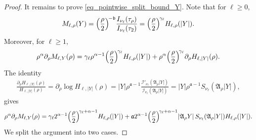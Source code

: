 \documentclass[12pt]{amsart}
\begin{document}
\begin{proof}
It remains to prove \eqref{eq_pointwise_split_bound_Y}. Note that for $\ell\ge 0$,
\begin{equation}\label{eq_M_H}
    M_{\ell,\rho}(Y) = \Bigl( \frac{\rho}{2} \Bigr)^{\!-\mathfrak b} \frac{I_{\nu_\ell}(\tau_\rho)}{I_{\nu_\ell}(\tau_2)} = \Bigl( \frac{\rho}{2} \Bigr)^{\!\gamma_\ell} H_{\ell,\rho}(|Y|).
\end{equation}
Moreover, for $\ell\ge 1$,
\begin{align*}
    \rho^\alpha \partial_\rho M_{\ell, Y}(\rho)
    = \gamma_\ell \rho^{\alpha-1} \Bigl(\frac{\rho}{2}\Bigr)^{\!\gamma_\ell} H_{\ell,\rho}(|Y|) + \rho^{\alpha} \Bigl(\frac{\rho}{2}\Bigr)^{\!\gamma_\ell} \partial_\rho H_{\ell,|Y|}(\rho).
\end{align*}
The identity
\begin{align*}
    \frac{\partial_\rho H_{\ell, |Y|}(\rho)}{H_{\ell, |Y|}(\rho)}
    = \partial_\rho \log H_{\ell, |Y|}(\rho)
    = |Y| \rho^{\mathfrak a-1} \frac{\mathcal{I}'_{\nu_\ell}(\mathfrak A_\rho |Y|)}{\mathcal{I}_{\nu_\ell}(\mathfrak A_\rho |Y|)}
    = |Y| \rho^{\mathfrak a-1} S_{\nu_\ell}(\mathfrak A_\rho |Y|),
\end{align*}
gives
\begin{align}\label{eq_rad_M_H}
    \rho^\alpha \partial_\rho M_{\ell, Y}(\rho)
    = \gamma_\ell 2^{\alpha-1} \Bigl(\frac{\rho}{2}\Bigr)^{\!\gamma_\ell+\alpha-1} H_{\ell, \rho}(|Y|)
    + \mathfrak a 2^{\alpha -1} \Bigl(\frac{\rho}{2}\Bigr)^{\!\gamma_\ell+\alpha - 1} |\mathfrak A_\rho Y| \, S_{\nu_\ell}(\mathfrak A_\rho |Y|) H_{\ell, \rho}(|Y|).
\end{align}
We split the argument into two cases.


\end{proof}
\end{document}
